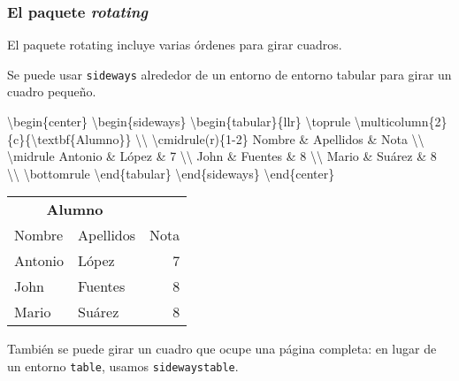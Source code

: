 \documentclass[11pt]{article}
\newenvironment{Shaded}{}{}
\newcommand{\NormalTok}[1]{{#1}}
\begin{document}
\subsubsection{El paquete \emph{rotating}}\label{el-paquete-rotating}

El paquete rotating incluye varias órdenes para girar cuadros.

Se puede usar \texttt{sideways} alrededor de un entorno de entorno
tabular para girar un cuadro pequeño.

\begin{Shaded}
\begin{Highlighting}[]
\NormalTok{\textbackslash{}begin\{center\}}
\NormalTok{\textbackslash{}begin\{sideways\}}
\NormalTok{\textbackslash{}begin\{tabular\}\{llr\}}
\NormalTok{\textbackslash{}toprule}
\NormalTok{\textbackslash{}multicolumn\{2\}\{c\}\{\textbackslash{}textbf\{Alumno\}\} \textbackslash{}\textbackslash{}}
\NormalTok{\textbackslash{}cmidrule(r)\{1-2\}}
\NormalTok{Nombre & Apellidos & Nota \textbackslash{}\textbackslash{}}
\NormalTok{\textbackslash{}midrule}
\NormalTok{Antonio & López & 7 \textbackslash{}\textbackslash{}}
\NormalTok{John & Fuentes & 8 \textbackslash{}\textbackslash{}}
\NormalTok{Mario & Suárez & 8 \textbackslash{}\textbackslash{}}
\NormalTok{\textbackslash{}bottomrule}
\NormalTok{\textbackslash{}end\{tabular\}}
\NormalTok{\textbackslash{}end\{sideways\}}
\NormalTok{\textbackslash{}end\{center\}}
\end{Highlighting}
\end{Shaded}

\begin{center}
\begin{sideways}
\begin{tabular}{llr}
\toprule
\multicolumn{2}{c}{\textbf{Alumno}} \\
\cmidrule(r){1-2}
Nombre & Apellidos & Nota \\
\midrule
Antonio & López & 7 \\
John & Fuentes & 8 \\
Mario & Suárez & 8 \\
\bottomrule
\end{tabular}
\end{sideways}
\end{center}


También se puede girar un cuadro que ocupe una página completa: en lugar
de un entorno \texttt{table}, usamos \texttt{sidewaystable}.
\end{document}
